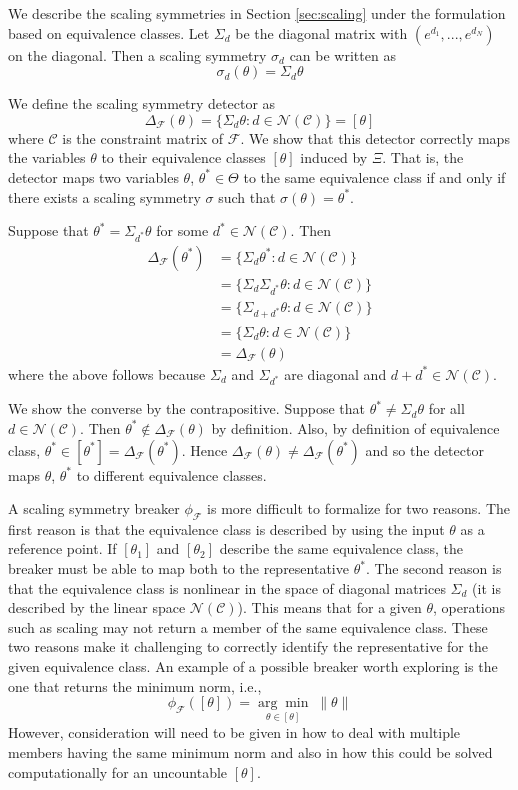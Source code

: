 We describe the scaling symmetries in Section \ref{sec:scaling} under the formulation based on equivalence classes. Let $\Sigma_d$ be the diagonal matrix with $(e^{d_1},...,e^{d_N})$ on the diagonal. Then a scaling symmetry $\sigma_d$ can be written as
\[
\sigma_d(\theta)=\Sigma_d\theta
\]

We define the scaling symmetry detector as
\[
\Delta_\mathcal{F}(\theta) = \{\Sigma_d\theta:d\in\mathcal{N}(\mathcal{C})\}=[\theta]
\]
where $\mathcal{C}$ is the constraint matrix of $\mathcal{F}$. We show that this detector correctly maps the variables $\theta$ to their equivalence classes $[\theta]$ induced by $\Xi$. That is, the detector maps two variables $\theta$, $\theta^*\in\Theta$ to the same equivalence class if and only if there exists a scaling symmetry $\sigma$ such that $\sigma(\theta)=\theta^*$.

Suppose that $\theta^*=\Sigma_{d^*}\theta$ for some $d^*\in\mathcal{N}(\mathcal{C})$. Then
\begin{align*}
\Delta_\mathcal{F}(\theta^*) &= \{\Sigma_d\theta^*:d\in\mathcal{N}(\mathcal{C})\} \\
&= \{\Sigma_d\Sigma_{d^*}\theta:d\in\mathcal{N}(\mathcal{C})\} \\
&= \{\Sigma_{d+d^*}\theta:d\in\mathcal{N}(\mathcal{C})\} \\
&= \{\Sigma_d\theta:d\in\mathcal{N}(\mathcal{C})\} \\
&= \Delta_\mathcal{F}(\theta)
\end{align*}
where the above follows because $\Sigma_d$ and $\Sigma_{d^*}$ are diagonal and $d+d^*\in\mathcal{N}(\mathcal{C})$.

We show the converse by the contrapositive. Suppose that $\theta^*\neq\Sigma_{d}\theta$ for all $d\in\mathcal{N}(\mathcal{C})$. Then $\theta^*\notin\Delta_\mathcal{F}(\theta)$ by definition. Also, by definition of equivalence class, $\theta^*\in[\theta^*]=\Delta_\mathcal{F}(\theta^*)$. Hence $\Delta_\mathcal{F}(\theta)\neq\Delta_\mathcal{F}(\theta^*)$ and so the detector maps $\theta$, $\theta^*$ to different equivalence classes.

A scaling symmetry breaker $\phi_\mathcal{F}$ is more difficult to formalize for two reasons. The first reason is that the equivalence class is described by using the input $\theta$ as a reference point. If $[\theta_1]$ and $[\theta_2]$ describe the same equivalence class, the breaker must be able to map both to the representative $\theta^*$. The second reason is that the equivalence class is nonlinear in the space of diagonal matrices $\Sigma_d$ (it is described by the linear space $\mathcal{N}(\mathcal{C})$). This means that for a given $\theta$, operations such as scaling may not return a member of the same equivalence class. These two reasons make it challenging to correctly identify the representative for the given equivalence class. An example of a possible breaker worth exploring is the one that returns the minimum norm, i.e.,
\[
\phi_\mathcal{F}([\theta]) = \underset{\theta\in[\theta]}{\arg\min}\;\|\theta\|
\]
However, consideration will need to be given in how to deal with multiple members having the same minimum norm and also in how this could be solved computationally for an uncountable $[\theta]$.

